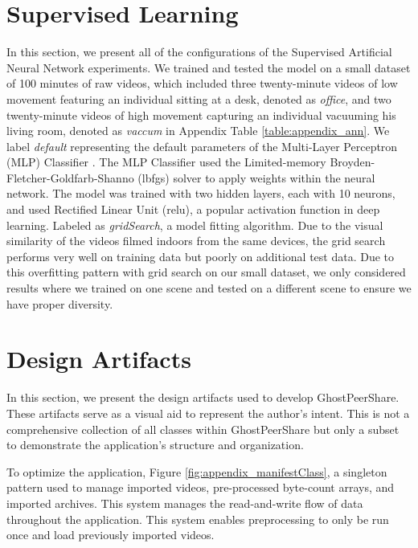 \documentclass [11pt, proquest] {uwthesis}[2020/02/24]
\begin{document}
%
%
\nocite{*}   %


%
%
\appendix
\raggedbottom\sloppy
 
 
\chapter{Supervised Learning}

In this section, we present all of the configurations of the Supervised Artificial Neural Network experiments. We trained and tested the model on a small dataset of 100 minutes of raw videos, which included three twenty-minute videos of low movement featuring an individual sitting at a desk, denoted as \textit{office}, and two twenty-minute videos of high movement capturing an individual vacuuming his living room, denoted as \textit{vaccum} in Appendix Table \ref{table:appendix_ann}. We label \textit{default} representing the default parameters of the Multi-Layer Perceptron (MLP) Classifier \cite{scikit-learn}. The MLP Classifier used the Limited-memory Broyden-Fletcher-Goldfarb-Shanno (lbfgs) solver to apply weights within the neural network. The model was trained with two hidden layers, each with 10 neurons, and used Rectified Linear Unit (relu), a popular activation function in deep learning. Labeled as \textit{gridSearch}, a model fitting algorithm. Due to the visual similarity of the videos filmed indoors from the same devices, the grid search performs very well on training data but poorly on additional test data. Due to this overfitting pattern with grid search on our small dataset, we only considered results where we trained on one scene and tested on a different scene to ensure we have proper diversity.
 


\chapter{Design Artifacts}

In this section, we present the design artifacts used to develop GhostPeerShare. These artifacts serve as a visual aid to represent the author's intent. This is not a comprehensive collection of all classes within GhostPeerShare but only a subset to demonstrate the application's structure and organization.

To optimize the application, Figure \ref{fig:appendix_manifestClass}, a singleton pattern used to manage imported videos, pre-processed byte-count arrays, and imported archives. This system manages the read-and-write flow of data throughout the application. This system enables preprocessing to only be run once and load previously imported videos.
\end{document}
